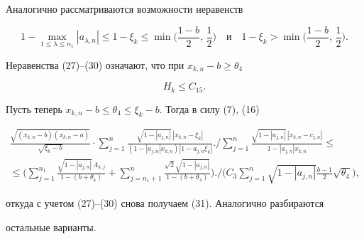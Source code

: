 Аналогично рассматриваются возможности неравенств


$$


1-\max_{1\le\lambda\le n_1}|a_{\lambda,n}|\le 1-\xi_k


\le\min\biggl(\frac{1-b}{2},\,\frac{1}{2} \biggr)\quad


\text{и}\quad


1-\xi_k>\min\biggl(\frac{1-b}{2},\,\frac{1}{2} \biggr).


$$





Неравенства (27)--(30) означают, что при $x_{k,n}-b\ge\theta_4$


\begin{equation}


H_k\le C_{15}.


\end{equation}


Пусть теперь $x_{k,n}-b\le\theta_4\le\xi_k-b$. Тогда в силу (7), (16)


\begin{multline*}


\frac{\sqrt{(x_{k,n}-b)(x_{k,n}-a)}}{\sqrt{\xi_k-b}}\cdot


\sum\limits^n_{j=1}


\frac{\sqrt{1-|a_{j,n}|}\,|x_{k,n}-\xi_k|}


{(1-|a_{j,n}|x_{k,n})|1-a_{j,n}\xi_k|}\biggl.\biggr/


\sum\limits^n_{j=1}


\frac{\sqrt{1-|a_{j,n}|}\,|x_{k,n}-c_{j,n}|}


{1-|a_{j,n}|x_{k,n}} \le \\


\le \biggl(\sum\limits^{n_1}_{j=1}


\frac{\sqrt{1-|a_{j,n}|}\,\Lambda_{k,j}}{1-(b+\theta_4)}


+\sum\limits^n_{j=n_1+1}


\frac{\sqrt{2}\sqrt{1-|a_{j,n}|}}{1-(b+\theta_4)}\biggr)\biggl.\biggr/


\biggl(C_3\sum\limits^n_{j=1}\sqrt{1-|a_{j,n}|}


\frac{b-1}{2}\sqrt{\theta_4}\biggr),


\end{multline*}


откуда с учетом (27)--(30) снова получаем (31). Аналогично разбираются


остальные варианты.





